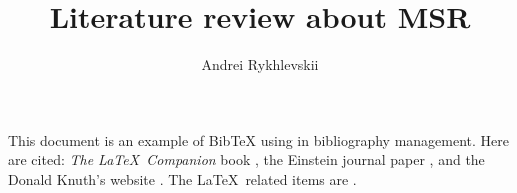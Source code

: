 \documentclass[a4paper,10pt]{article}
\title{Literature review about MSR}
\author{Andrei Rykhlevskii}
\begin{document}
\maketitle

This document is an example of BibTeX using in bibliography management. Here are cited: \textit{The \LaTeX\ Companion} book \cite{mccoymaterals}, the Einstein journal paper \cite{msrhistory}, and the Donald Knuth's website \cite{knuthwebsite}. The \LaTeX\ related items are \cite{knuthwebsite}. 

\medskip


\end{document}
